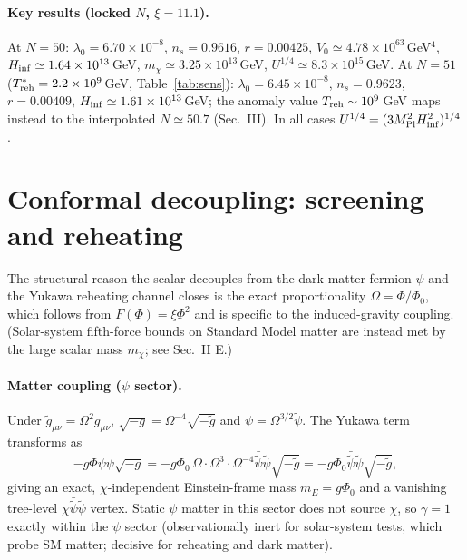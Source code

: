\documentclass[pdflatex,sn-mathphys-num]{sn-jnl}
\newcommand{\MP}{M_{\rm Pl}}
\newcommand{\PhiV}{\Phi_0}
\theoremstyle{thmstyleone}
\begin{document}
\begin{appendices}
\paragraph{Key results (locked $N$, $\xi=11.1$).} At $N=50$: $\lambda_0=6.70\times10^{-8}$, $n_s=0.9616$, $r=0.00425$, $V_0\simeq4.78\times10^{63}\,$GeV$^4$, $H_{\rm inf}\simeq1.64\times10^{13}\,$GeV, $m_\chi\simeq3.25\times10^{13}\,$GeV, $U^{1/4}\simeq8.3\times10^{15}\,$GeV. At $N=51$ ($T_{\rm reh}^*=2.2\times10^{9}\,$GeV, Table~\ref{tab:sens}): $\lambda_0=6.45\times10^{-8}$, $n_s=0.9623$, $r=0.00409$, $H_{\rm inf}\simeq1.61\times10^{13}\,$GeV; the anomaly value $T_{\rm reh}\sim10^9\,$GeV maps instead to the interpolated $N\simeq50.7$ (Sec.~III). In all cases $U^{1/4}=(3\MP^2H_{\rm inf}^2)^{1/4}$.

\section{Conformal decoupling: screening and reheating}

The structural reason the scalar decouples from the dark-matter fermion $\psi$ and the Yukawa reheating channel closes is the exact proportionality $\Omega=\Phi/\PhiV$, which follows from $F(\Phi)=\xi\Phi^2$ and is specific to the induced-gravity coupling. (Solar-system fifth-force bounds on Standard Model matter are instead met by the large scalar mass $m_\chi$; see Sec.~II E.)

\paragraph{Matter coupling ($\psi$ sector).} Under $\tilde g_{\mu\nu}=\Omega^2 g_{\mu\nu}$, $\sqrt{-g}=\Omega^{-4}\sqrt{-\tilde g}$ and $\psi=\Omega^{3/2}\tilde\psi$. The Yukawa term transforms as
\begin{equation}
-g\Phi\bar\psi\psi\sqrt{-g}=-g\PhiV\,\Omega\cdot\Omega^3\cdot\Omega^{-4}\bar{\tilde\psi}\tilde\psi\sqrt{-\tilde g}
=-g\PhiV\bar{\tilde\psi}\tilde\psi\sqrt{-\tilde g},
\label{eq:B1}
\end{equation}
giving an exact, $\chi$-independent Einstein-frame mass $m_E=g\PhiV$ and a vanishing tree-level $\chi\bar{\tilde\psi}\tilde\psi$ vertex. Static $\psi$ matter in this sector does not source $\chi$, so $\gamma=1$ exactly within the $\psi$ sector (observationally inert for solar-system tests, which probe SM matter; decisive for reheating and dark matter).


\end{appendices}
\end{document}
